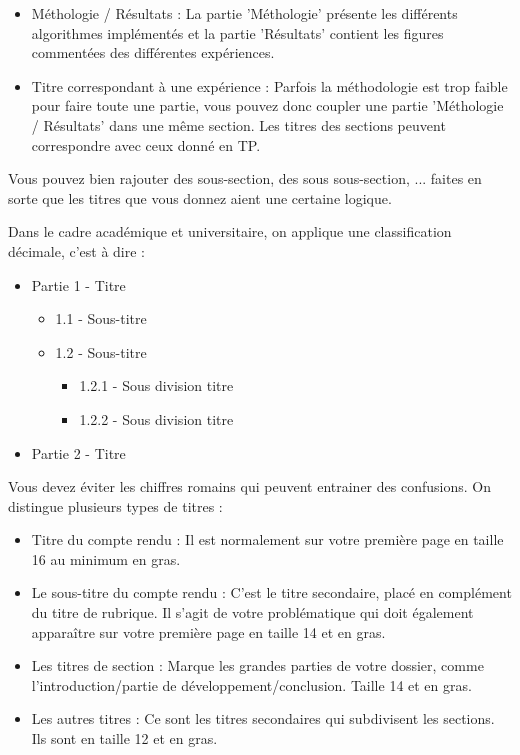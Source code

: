\documentclass[11pt]{article}
\providecommand{\tightlist}{%
      \setlength{\itemsep}{0pt}\setlength{\parskip}{0pt}}
\begin{document}
\begin{itemize}
\tightlist
\item
  Méthologie / Résultats : La partie 'Méthologie' présente les
  différents algorithmes implémentés et la partie 'Résultats' contient
  les figures commentées des différentes expériences.
\item
  Titre correspondant à une expérience : Parfois la méthodologie est
  trop faible pour faire toute une partie, vous pouvez donc coupler une
  partie 'Méthologie / Résultats' dans une même section. Les titres des
  sections peuvent correspondre avec ceux donné en TP.
\end{itemize}

Vous pouvez bien rajouter des sous-section, des sous sous-section, ...
faites en sorte que les titres que vous donnez aient une certaine
logique.

Dans le cadre académique et universitaire, on applique une
classification décimale, c'est à dire :

\begin{itemize}
\tightlist
\item
  Partie 1 - Titre

  \begin{itemize}
  \tightlist
  \item
    1.1 - Sous-titre
  \item
    1.2 - Sous-titre

    \begin{itemize}
    \tightlist
    \item
      1.2.1 - Sous division titre
    \item
      1.2.2 - Sous division titre
    \end{itemize}
  \end{itemize}
\item
  Partie 2 - Titre
\end{itemize}

Vous devez éviter les chiffres romains qui peuvent entrainer des
confusions. On distingue plusieurs types de titres :

\begin{itemize}
\item
  Titre du compte rendu : Il est normalement sur votre première page en
  taille 16 au minimum en gras.
\item
  Le sous-titre du compte rendu : C'est le titre secondaire, placé en
  complément du titre de rubrique. Il s'agit de votre problématique qui
  doit également apparaître sur votre première page en taille 14 et en
  gras.
\item
  Les titres de section : Marque les grandes parties de votre dossier,
  comme l'introduction/partie de développement/conclusion. Taille 14 et
  en gras.
\item
  Les autres titres : Ce sont les titres secondaires qui subdivisent les
  sections. Ils sont en taille 12 et en gras.
\end{itemize}
\end{document}
